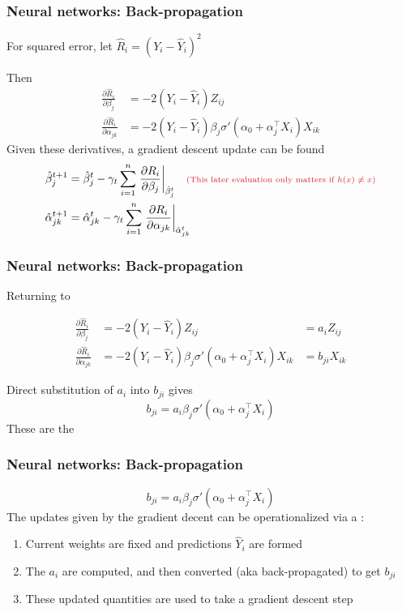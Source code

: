 \documentclass[12pt]{beamer}
\newcommand{\parenthetical}[2]{#1  \scriptstyle \alr{( #2)}}
\begin{document}
\begin{frame}[fragile]
\frametitle{Neural networks: Back-propagation}
For squared error, let $\hat{R}_i = (Y_i - \hat{Y}_i)^2$

\vsp
Then
\begin{align*}
\frac{\partial \hat{R}_i}{\partial \beta_j} 
& = -2(Y_i - \hat{Y}_i)Z_{ij} \\
\frac{\partial \hat{R}_i}{\partial \alpha_{jk}}  
& = -2(Y_i - \hat{Y}_i)\beta_j \sigma'(\alpha_0 + \alpha_j^{\top} X_i)X_{ik}
\end{align*}
Given these derivatives, a gradient descent update can be found
\begin{align*}
\hat{\beta}_j^{t+1} 
& = 
\hat{\beta}_j^{t} - \gamma_t \sum_{i=1}^n \left. \frac{\partial R_i}{\partial \beta_j} \right|_{\hat{\beta}_j^{t}} 
\parenthetical{\quad}{\textrm{This later evaluation only matters if $h(x) \neq x$}}\\
\hat{\alpha}_{jk}^{t+1} 
& = 
\hat{\alpha}_{jk}^{t}  - \gamma_t \sum_{i=1}^n \left. \frac{\partial R_i}{\partial \alpha_{jk}} \right|_{\hat{\alpha}_{jk}^{t}} 
\end{align*}
\end{frame}

\begin{frame}[fragile]
\frametitle{Neural networks: Back-propagation}
Returning to 

\begin{align*}
\frac{\partial \hat{R}_i}{\partial \beta_j} 
& = -2(Y_i - \hat{Y}_i)Z_{ij} & = a_i Z_{ij}
\\
\frac{\partial \hat{R}_i}{\partial \alpha_{jk}}  
& = -2(Y_i - \hat{Y}_i)\beta_j \sigma'(\alpha_0 + \alpha_j^{\top} X_i)X_{ik} &  =  b_{ji} X_{ik}
\end{align*}
\vsp

Direct substitution of $a_i$ into $b_{ji}$ gives 
\[
b_{ji} = a_i \beta_j \sigma'(\alpha_0 + \alpha_j^{\top} X_i)
\]
These are the 
\end{frame}

\begin{frame}[fragile]
\frametitle{Neural networks: Back-propagation}
\[
b_{ji} = a_i \beta_j \sigma'(\alpha_0 + \alpha_j^{\top} X_i)
\]
The updates given by the gradient decent can be operationalized via a :
\begin{enumerate}
\item {} Current weights are fixed and predictions $\hat{Y}_i$ are formed
\item {} The $a_i$ are computed, and then converted (aka back-propagated)
to get $b_{ji}$
\item These updated quantities are used to take a gradient descent step
\end{enumerate}
\end{frame}
\end{document}
